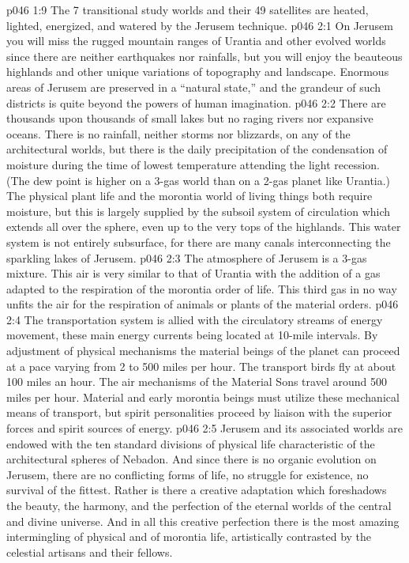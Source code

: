 \vs p046 1:9 The 7 transitional study worlds and their 49 satellites are heated, lighted, energized, and watered by the Jerusem technique.
\vs p046 2:1 On Jerusem you will miss the rugged mountain ranges of Urantia and other evolved worlds since there are neither earthquakes nor rainfalls, but you will enjoy the beauteous highlands and other unique variations of topography and landscape. Enormous areas of Jerusem are preserved in a “natural state,” and the grandeur of such districts is quite beyond the powers of human imagination.
\vs p046 2:2 There are thousands upon thousands of small lakes but no raging rivers nor expansive oceans. There is no rainfall, neither storms nor blizzards, on any of the architectural worlds, but there is the daily precipitation of the condensation of moisture during the time of lowest temperature attending the light recession. (The dew point is higher on a 3\hyp{}gas world than on a 2\hyp{}gas planet like Urantia.) The physical plant life and the morontia world of living things both require moisture, but this is largely supplied by the subsoil system of circulation which extends all over the sphere, even up to the very tops of the highlands. This water system is not entirely subsurface, for there are many canals interconnecting the sparkling lakes of Jerusem.
\vs p046 2:3 The atmosphere of Jerusem is a 3\hyp{}gas mixture. This air is very similar to that of Urantia with the addition of a gas adapted to the respiration of the morontia order of life. This third gas in no way unfits the air for the respiration of animals or plants of the material orders.
\vs p046 2:4 The transportation system is allied with the circulatory streams of energy movement, these main energy currents being located at 10\hyp{}mile intervals. By adjustment of physical mechanisms the material beings of the planet can proceed at a pace varying from 2 to 500 miles per hour. The transport birds fly at about 100 miles an hour. The air mechanisms of the Material Sons travel around 500 miles per hour. Material and early morontia beings must utilize these mechanical means of transport, but spirit personalities proceed by liaison with the superior forces and spirit sources of energy.
\vs p046 2:5 \pc Jerusem and its associated worlds are endowed with the ten standard divisions of physical life characteristic of the architectural spheres of Nebadon. And since there is no organic evolution on Jerusem, there are no conflicting forms of life, no struggle for existence, no survival of the fittest. Rather is there a creative adaptation which foreshadows the beauty, the harmony, and the perfection of the eternal worlds of the central and divine universe. And in all this creative perfection there is the most amazing intermingling of physical and of morontia life, artistically contrasted by the celestial artisans and their fellows.
